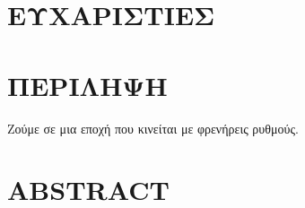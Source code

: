 \maketitle

\frontmatter

	\chapter{ΕΥΧΑΡΙΣΤΙΕΣ}
	\newpage

	\chapter{ΠΕΡΙΛΗΨΗ}
	Ζούμε σε μια εποχή που κινείται με φρενήρεις ρυθμούς.
	\newpage

	\chapter{ABSTRACT}
	\newpage


	\tableofcontents
	\newpage

	\listoffigures
	\listoftables
